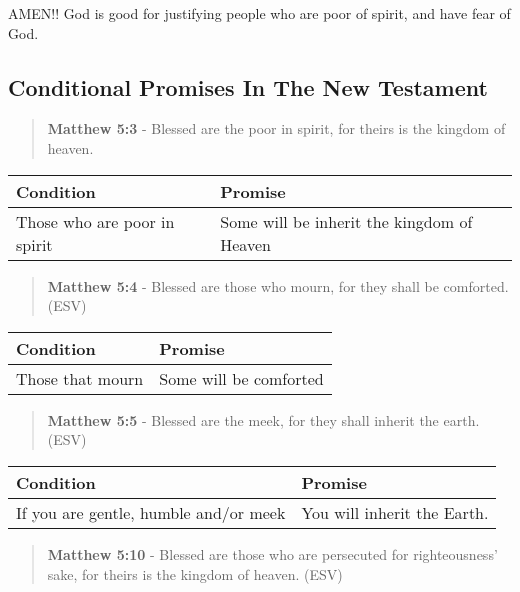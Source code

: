 \documentclass[11pt]{article}
\begin{document}
AMEN!! God is good for justifying people who are poor of spirit, and have fear of God.

\subsection{Conditional Promises In The New Testament}
\label{sec:org879e14c}
\begin{quote}
\textbf{Matthew 5:3} - Blessed are the poor in spirit, for theirs is the kingdom of heaven.
\end{quote}

\begin{center}
\begin{tabular}{ll}
Condition & Promise\\[0pt]
\hline
Those who are poor in spirit & Some will be inherit the kingdom of Heaven\\[0pt]
\end{tabular}
\end{center}

\begin{quote}
\textbf{Matthew 5:4} - Blessed are those who mourn, for they shall be comforted. (ESV)
\end{quote}

\begin{center}
\begin{tabular}{ll}
Condition & Promise\\[0pt]
\hline
Those that mourn & Some will be comforted\\[0pt]
\end{tabular}
\end{center}

\begin{quote}
\textbf{Matthew 5:5} - Blessed are the meek, for they shall inherit the earth. (ESV)
\end{quote}

\begin{center}
\begin{tabular}{ll}
Condition & Promise\\[0pt]
\hline
If you are gentle, humble and/or meek & You will inherit the Earth.\\[0pt]
\end{tabular}
\end{center}

\begin{quote}
\textbf{Matthew 5:10} - Blessed are those who are persecuted for righteousness' sake, for theirs is the kingdom of heaven. (ESV)
\end{quote}
\end{document}
